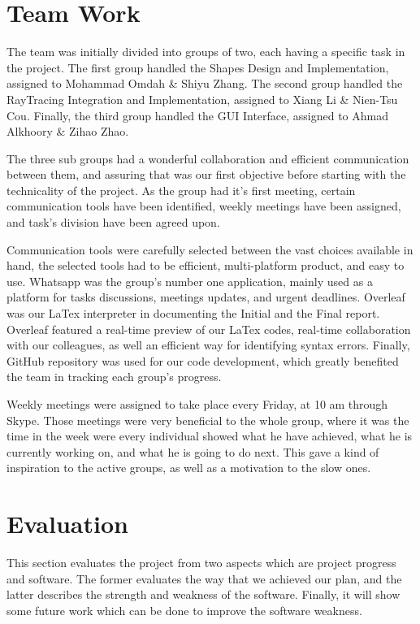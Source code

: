 \documentclass[a4paper, 12pt]{article}
\begin{document}
\section{Team Work}

The team was initially divided into groups of two, each having a specific task in the project. The first group handled the Shapes Design and Implementation, assigned to Mohammad Omdah \& Shiyu Zhang. The second group handled the RayTracing Integration and Implementation, assigned to Xiang Li \& Nien-Tsu Cou. Finally, the third group handled the GUI Interface, assigned to Ahmad Alkhoory \& Zihao Zhao.

The three sub groups had a wonderful collaboration and efficient communication between them, and assuring that was our first objective before starting with the technicality of the project. As the group had it's first meeting, certain communication tools have been identified, weekly meetings have been assigned, and task's division have been agreed upon.

Communication tools were carefully selected between the vast choices available in hand, the selected tools had to be efficient, multi-platform product, and easy to use. Whatsapp was the group's number one application, mainly used as a platform for tasks discussions, meetings updates, and urgent deadlines. Overleaf was our LaTex interpreter in documenting the Initial and the Final report. Overleaf featured a real-time preview of our LaTex codes, real-time collaboration with our colleagues, as well an efficient way for identifying syntax errors. Finally, GitHub repository was used for our code development, which greatly benefited the team in tracking each group's progress.

Weekly meetings were assigned to take place every Friday, at 10 am through Skype. Those meetings were very beneficial to the whole group, where it was the time in the week were every individual showed what he have achieved, what he is currently working on, and what he is going to do next. This gave a kind of inspiration to the active groups, as well as a motivation to the slow ones.

\section{Evaluation}
This section evaluates the project from two aspects which are project progress and software. The former evaluates the way that we achieved our plan, and the latter describes the strength and weakness of the software. Finally, it will show some future work which can be done to improve the software weakness. 
\end{document}
